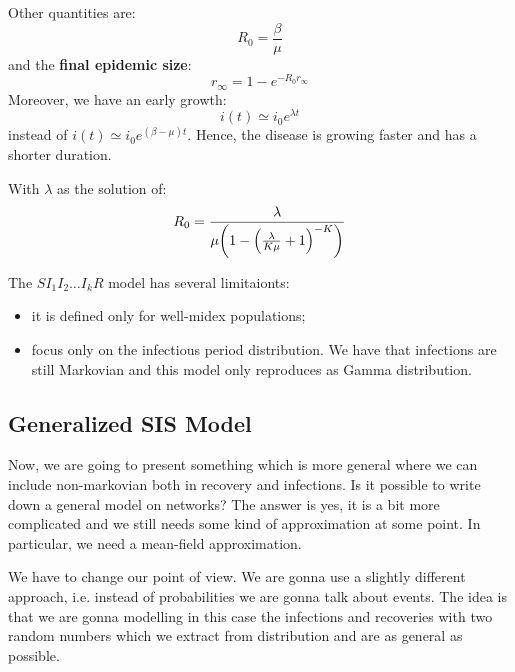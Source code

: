 \documentclass[../main/main.tex]{subfiles}
\begin{document}
Other quantities are:
\begin{equation*}
  R_0 = \frac{\beta }{\mu }
\end{equation*}
and the \textbf{final epidemic size}:
\begin{equation*}
  r_ \infty  = 1 - e^{- R_0 r_ \infty }
\end{equation*}
Moreover, we have an early growth:
\begin{equation*}
  i(t) \simeq i_0 e^{\lambda t}
\end{equation*}
instead of \( i(t) \simeq i_0 e^{(\beta - \mu )t}  \). Hence, the disease is growing faster and has a shorter duration.

With \( \lambda  \) as the solution of:
\begin{equation*}
  R_0 = \frac{\lambda }{\mu  \qty(1- \qty(\frac{\lambda }{K \mu } + 1) ^{-K}) }
\end{equation*}

The \( S I_1 I_2 \dots I_k R \) model has several limitaionts:
\begin{itemize}
\item it is defined only for well-midex populations;
\item focus only on the infectious period distribution. We have that infections are still Markovian and this model only reproduces as Gamma distribution.
\end{itemize}


\subsection{Generalized SIS Model}

Now, we are going to present something which is more general where we can include non-markovian both in recovery and infections.
Is it possible to write down a general model on networks? The answer is  yes, it is a bit more complicated and we still needs some kind of approximation at some point.
In particular, we need a mean-field approximation.

We have to change our point of view. We are gonna use a slightly different approach, i.e. instead of probabilities we are gonna talk about events. The idea is that we are gonna modelling in this case the infections and recoveries with two random numbers which we extract from distribution and are as general as possible.
\end{document}
